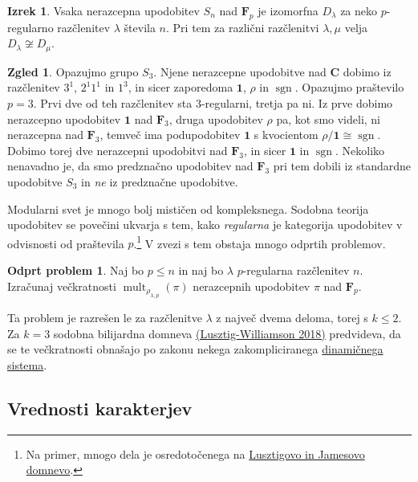 \documentclass[11pt]{book}
\def\CC{\mathbf{C}}
\def\11{\mathbf{1}}
\def\FF{\mathbf{F}}
\DeclareMathOperator\sgn{sgn}
\DeclareMathOperator\mult{mult}
\theoremstyle{definition}
\theoremstyle{zgled}
\newtheorem*{zgled}{Zgled}
\theoremstyle{odprtproblem}
\newtheorem*{odprtproblem}{Odprt problem}
\theoremstyle{domacanaloga}
\theoremstyle{izrek}
\newtheorem*{izrek}{Izrek}
\begin{document}
\begin{izrek}
    Vsaka nerazcepna upodobitev $S_n$ nad $\FF_p$ je izomorfna $D_{\lambda}$ za neko $p$-regularno razčlenitev $\lambda$ števila $n$. Pri tem za različni razčlenitvi $\lambda , \mu$ velja $D_{\lambda} \not\cong D_{\mu}$.
\end{izrek}

\begin{zgled}
Opazujmo grupo $S_3$. Njene nerazcepne upodobitve nad $\CC$ dobimo iz razčlenitev $3^1$, $2^1 1^1$ in $1^3$, in sicer zaporedoma $\11$, $\rho$ in $\sgn$. Opazujmo praštevilo $p = 3$. Prvi dve od teh razčlenitev sta $3$-regularni, tretja pa ni. Iz prve dobimo nerazcepno upodobitev $\11$ nad $\FF_3$, druga upodobitev $\rho$ pa, kot smo videli, ni nerazcepna nad $\FF_3$, temveč ima podupodobitev $\11$ s kvocientom $\rho / \11 \cong \sgn$. Dobimo torej dve nerazcepni upodobitvi nad $\FF_3$, in sicer $\11$ in $\sgn$. Nekoliko nenavadno je, da smo predznačno upodobitev nad $\FF_3$ pri tem dobili iz standardne upodobitve $S_3$ in \emph{ne} iz predznačne upodobitve.
\end{zgled}

Modularni svet je mnogo bolj mističen od kompleksnega. Sodobna teorija upodobitev se povečini ukvarja s tem, kako \emph{regularna} je kategorija upodobitev v odvisnosti od praštevila $p$.\footnote{Na primer, mnogo dela je osredotočenega na \href{https://mathoverflow.net/questions/138310/what-to-do-now-that-lusztigs-and-james-conjectures-have-been-shown-to-be-false}{Lusztigovo in Jamesovo domnevo}.} V zvezi s tem obstaja mnogo odprtih problemov.

\begin{odprtproblem}
Naj bo $p \leq n$ in naj bo $\lambda$ $p$-regularna razčlenitev $n$. Izračunaj večkratnosti $\mult_{\rho_{\lambda,p}}(\pi)$ nerazcepnih upodobitev $\pi$ nad $\FF_p$.
\end{odprtproblem}

Ta problem je razrešen le za razčlenitve $\lambda$ z največ dvema deloma, torej s $k \leq 2$. Za $k = 3$ sodobna bilijardna domneva \href{https://arxiv.org/pdf/1703.05898.pdf}{(Lusztig-Williamson 2018)} predvideva, da se te večkratnosti obnašajo po zakonu nekega zakompliciranega \href{https://www.youtube.com/watch?v=Ru0Zys1Vvq4}{dinamičnega sistema}.

\subsection{Vrednosti karakterjev}
\end{document}
